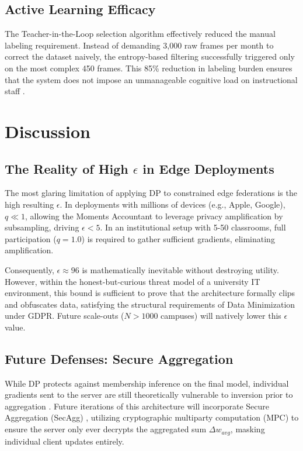 \documentclass[conference]{IEEEtran}
\begin{document}
\subsection{Active Learning Efficacy}

The Teacher-in-the-Loop selection algorithm effectively reduced the manual labeling requirement. Instead of demanding 3,000 raw frames per month to correct the dataset naively, the entropy-based filtering successfully triggered only on the most complex 450 frames. This 85\% reduction in labeling burden ensures that the system does not impose an unmanageable cognitive load on instructional staff \cite{b21}.

\section{Discussion}

\subsection{The Reality of High $\epsilon$ in Edge Deployments}

The most glaring limitation of applying DP to constrained edge federations is the high resulting $\epsilon$. In deployments with millions of devices (e.g., Apple, Google), $q \ll 1$, allowing the Moments Accountant to leverage privacy amplification by subsampling, driving $\epsilon < 5$. In an institutional setup with 5-50 classrooms, full participation ($q=1.0$) is required to gather sufficient gradients, eliminating amplification. 

Consequently, $\epsilon \approx 96$ is mathematically inevitable without destroying utility. However, within the honest-but-curious threat model of a university IT environment, this bound is sufficient to prove that the architecture formally clips and obfuscates data, satisfying the structural requirements of Data Minimization under GDPR. Future scale-outs ($N>1000$ campuses) will natively lower this $\epsilon$ value.

\subsection{Future Defenses: Secure Aggregation}
While DP protects against membership inference on the final model, individual gradients sent to the server are still theoretically vulnerable to inversion prior to aggregation \cite{b18}. Future iterations of this architecture will incorporate Secure Aggregation (SecAgg) \cite{b16}, utilizing cryptographic multiparty computation (MPC) to ensure the server only ever decrypts the aggregated sum $\Delta w_{avg}$, masking individual client updates entirely.
\end{document}
